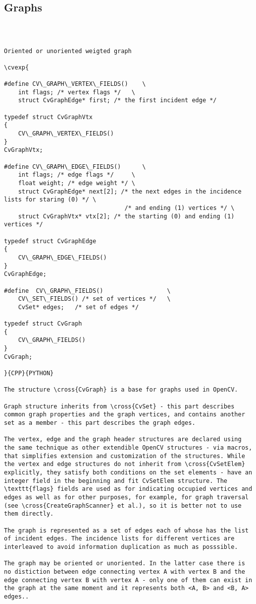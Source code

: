 \subsection{Graphs}
\begin{verbatim}


\end{verbatim}
\label{CvGraph}
\begin{verbatim}

Oriented or unoriented weigted graph

\cvexp{

#define CV\_GRAPH\_VERTEX\_FIELDS()    \
    int flags; /* vertex flags */   \
    struct CvGraphEdge* first; /* the first incident edge */

typedef struct CvGraphVtx
{
    CV\_GRAPH\_VERTEX\_FIELDS()
}
CvGraphVtx;

#define CV\_GRAPH\_EDGE\_FIELDS()      \
    int flags; /* edge flags */     \
    float weight; /* edge weight */ \
    struct CvGraphEdge* next[2]; /* the next edges in the incidence lists for staring (0) */ \
                                  /* and ending (1) vertices */ \
    struct CvGraphVtx* vtx[2]; /* the starting (0) and ending (1) vertices */

typedef struct CvGraphEdge
{
    CV\_GRAPH\_EDGE\_FIELDS()
}
CvGraphEdge;

#define  CV\_GRAPH\_FIELDS()                  \
    CV\_SET\_FIELDS() /* set of vertices */   \
    CvSet* edges;   /* set of edges */

typedef struct CvGraph
{
    CV\_GRAPH\_FIELDS()
}
CvGraph;

}{CPP}{PYTHON}

The structure \cross{CvGraph} is a base for graphs used in OpenCV.

Graph structure inherits from \cross{CvSet} - this part describes common graph properties and the graph vertices, and contains another set as a member - this part describes the graph edges.

The vertex, edge and the graph header structures are declared using the same technique as other extendible OpenCV structures - via macros, that simplifies extension and customization of the structures. While the vertex and edge structures do not inherit from \cross{CvSetElem} explicitly, they satisfy both conditions on the set elements - have an integer field in the beginning and fit CvSetElem structure. The \texttt{flags} fields are used as for indicating occupied vertices and edges as well as for other purposes, for example, for graph traversal (see \cross{CreateGraphScanner} et al.), so it is better not to use them directly.

The graph is represented as a set of edges each of whose has the list of incident edges. The incidence lists for different vertices are interleaved to avoid information duplication as much as posssible.

The graph may be oriented or unoriented. In the latter case there is no distiction between edge connecting vertex A with vertex B and the edge connecting vertex B with vertex A - only one of them can exist in the graph at the same moment and it represents both <A, B> and <B, A> edges..


\end{verbatim}

